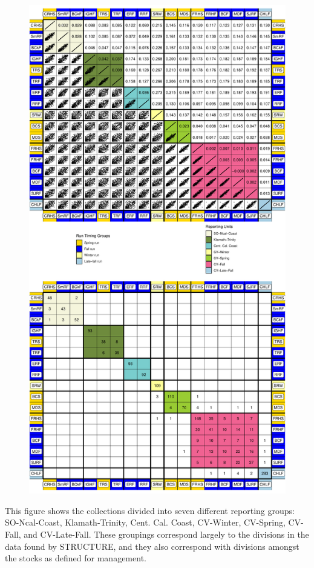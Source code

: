 \begin{figure}
\begin{center}
\includegraphics[width=\columnwidth]{images/gsi_and_fst_fig-crop.pdf}
\end{center}
\caption[\gsicap]{\gsicap}
\label{fig:gsi}
\end{figure}
This figure shows the collections divided into seven different reporting groups:
SO-Ncal-Coast,  Klamath-Trinity, Cent. Cal. Coast,
CV-Winter, CV-Spring, CV-Fall, and  CV-Late-Fall.   These groupings correspond
largely to the divisions in the data found by STRUCTURE, and they also correspond
with divisions amongst the stocks as defined for management.

